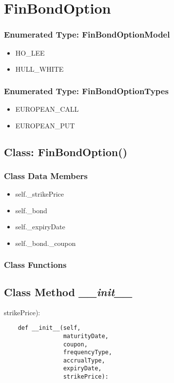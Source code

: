 \documentclass[twoside,11pt]{book}
\begin{document}
\newpage
\section{FinBondOption}

\subsubsection{Enumerated Type: FinBondOptionModel}
\begin{itemize}
\item{HO\_LEE}
\item{HULL\_WHITE}
\end{itemize}

\subsubsection{Enumerated Type: FinBondOptionTypes}
\begin{itemize}
\item{EUROPEAN\_CALL}
\item{EUROPEAN\_PUT}
\end{itemize}

\subsection{Class: FinBondOption()}


\subsubsection{Class Data Members}
\begin{itemize}
\item{self.\_strikePrice}
\item{self.\_bond}
\item{self.\_expiryDate}
\item{self.\_bond.\_coupon}
\end{itemize}

\subsubsection{Class Functions}

\subsection{Class Method {\it \_\_init\_\_}}
strikePrice):

\begin{lstlisting}
    def __init__(self,
                 maturityDate,
                 coupon,
                 frequencyType,
                 accrualType,
                 expiryDate,
                 strikePrice):
\end{lstlisting}
\end{document}
